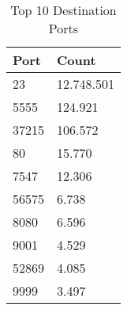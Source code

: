 \begin{table}
\caption{Top 10 Destination Ports}
\label{tab:top10_ports}
\begin{tabular}{ll}
\toprule
Port & Count \\
\midrule
23 & 12.748.501 \\
5555 & 124.921 \\
37215 & 106.572 \\
80 & 15.770 \\
7547 & 12.306 \\
56575 & 6.738 \\
8080 & 6.596 \\
9001 & 4.529 \\
52869 & 4.085 \\
9999 & 3.497 \\
\bottomrule
\end{tabular}
\end{table}

